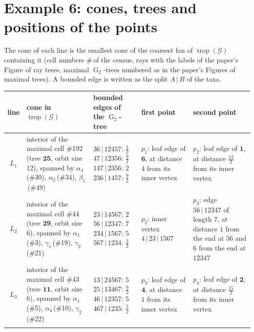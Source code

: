 \documentclass[10pt]{article}
\newcommand{\Ggroup}{\operatorname{G}_2}
\DeclareMathOperator{\trop}{trop}
\begin{document}
\newpage
\section*{Example 6: cones, trees and positions of the points}

The cone of each line is the smallest cone of the coarsest fan of \(\trop(\mathcal G)\) containing it (cell numbers
\#\,of the census, rays with the labels of the paper's Figure of ray trees, maximal \(\Ggroup\)-trees numbered as in the
paper's Figures of maximal trees). A bounded edge is written as the split \(A\,|\,B\) of the taxa.

\medskip
{\small
\begin{tabular}{@{}c p{4.1cm} p{3.7cm} p{6.9cm} p{6.9cm}@{}}\toprule
line & cone in \(\trop(\mathcal G)\) & bounded edges of the \(\Ggroup\)-tree & first point & second point \\\midrule
\(L_{1}\) & interior of the maximal cell \#192 (tree \(\mathbf{25}\), orbit size 12), spanned by \(\alpha_4\)\,(\#30), \(\alpha_2\)\,(\#34), \(\beta_1\)\,(\#49) & \(36\,|\,12457\): \(\tfrac{1}{2}\)\newline \(47\,|\,12356\): \(\tfrac{9}{2}\)\newline \(147\,|\,2356\): \(2\)\newline \(236\,|\,1457\): \(\tfrac{9}{2}\) & \(p_{1}\): leaf edge of \(\mathbf{6}\), at distance \(4\) from its inner vertex & \(p_{2}\): leaf edge of \(\mathbf{1}\), at distance \(\tfrac{13}{2}\) from its inner vertex \\\addlinespace
\(L_{2}\) & interior of the maximal cell \#44 (tree \(\mathbf{29}\), orbit size 6), spanned by \(\alpha_1\)\,(\#3), \(\gamma_1\)\,(\#19), \(\gamma_2\)\,(\#21) & \(23\,|\,14567\): \(2\)\newline \(56\,|\,12347\): \(7\)\newline \(234\,|\,1567\): \(5\)\newline \(567\,|\,1234\): \(\tfrac{3}{2}\) & \(p_{2}\): inner vertex \(4\,|\,23\,|\,1567\) & \(p_{3}\): edge \(56\,|\,12347\) of length \(7\), at distance \(1\) from the end at \(56\) and \(6\) from the end at \(12347\) \\\addlinespace
\(L_{3}\) & interior of the maximal cell \#43 (tree \(\mathbf{11}\), orbit size 6), spanned by \(\alpha_1\)\,(\#5), \(\alpha_4\)\,(\#10), \(\gamma_2\)\,(\#22) & \(13\,|\,24567\): \(5\)\newline \(25\,|\,13467\): \(\tfrac{9}{2}\)\newline \(46\,|\,12357\): \(5\)\newline \(467\,|\,1235\): \(\tfrac{5}{2}\) & \(p_{3}\): leaf edge of \(\mathbf{4}\), at distance \(1\) from its inner vertex & \(p_{4}\): leaf edge of \(\mathbf{2}\), at distance \(\tfrac{15}{2}\) from its inner vertex \\\addlinespace

\end{tabular}}
\end{document}
